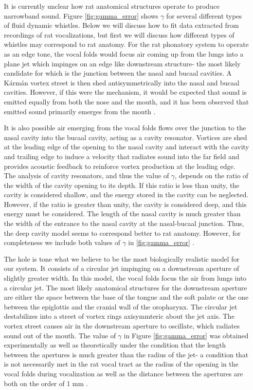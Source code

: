 \documentclass[twocolumn, prl]{revtex4}
\begin{document}
It is currently unclear how rat anatomical structures operate to produce narrowband sound. Figure \ref{fig:gamma_error} shows $\gamma$ for several different types of fluid dynamic whistles. Below we will discuss how to fit data extracted from recordings of rat vocalizations, but first we will discuss how different types of whistles may correspond to rat anatomy. For the rat phonatory system to operate as an edge tone, the vocal folds would focus air coming up from the lungs into a plane jet which impinges on an edge like downstream structure- the most likely candidate for which is the junction between the nasal and bucaal cavities. A Kármán vortex street is then shed antisymmetrically into the nasal and bucaal cavities. However, if this were the mechanism, it would be expected that sound is emitted equally from both the nose and the mouth, and it has been observed that emitted sound primarily emerges from the mouth \cite{Holger1977,Howe2008}.

It is also possible air emerging from the vocal folds flows over the junction to the nasal cavity into the bucaal cavity, acting as a cavity resonator. Vortices are shed at the leading edge of the opening to the nasal cavity and interact with the cavity and trailing edge to induce a velocity that radiates sound into the far field and provides acoustic feedback to reinforce vortex production at the leading edge. The analysis of cavity resonators, and thus the value of $\gamma$, depends on the ratio of the width of the cavity opening to its depth. If this ratio is less than unity, the cavity is considered shallow, and the energy stored in the cavity can be neglected. However, if the ratio is greater than unity, the cavity is considered deep, and this energy must be considered. The length of the nasal cavity is much greater than the width of the entrance to the nasal cavity at the nasal-bucaal junction. Thus, the deep cavity model seems to correspond better to rat anatomy. However, for completeness we include both values of $\gamma$ in \ref{fig:gamma_error} \cite{Howe2008}.

The hole is tone what we believe to be the most biologically realistic model for our system. It consists of a circular jet impinging on a downstream aperture of slightly greater width. In this model, the vocal folds focus the air from lungs into a circular jet. The most likely anatomical structures for the downstream aperture are either the space between the base of the tongue and the soft palate or the one between the epiglottis and the cranial wall of the oropharynx. The circular jet destabilizes into a street of vortex rings axisymmteric about the jet axis. The vortex street causes air in the downstream aperture to oscillate, which radiates sound out of the mouth. The value of $\gamma$ in Figure \ref{fig:gamma_error} was obtained experimentally as well as theoretically under the condition that the length between the apertures is much greater than the radius of the jet- a condition that is not necessarily met in the rat vocal tract as the radius of the opening in the vocal folds during vocalization as well as the distance between the apertures are both on the order of 1 mm \cite{Brudzynski2010,Chanaud1965,Howe2008}.
\end{document}

